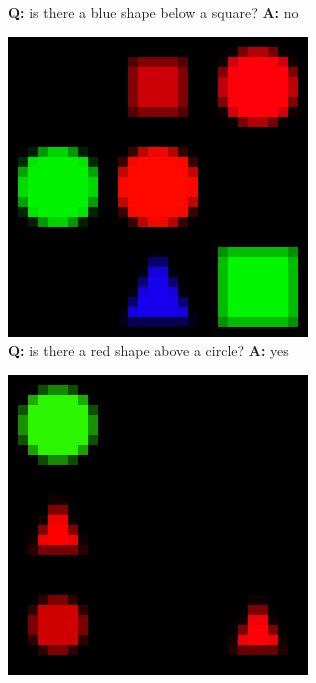 \begin{figure}[ht]
\begin{subfigure}[b]{0.24\linewidth}
    \caption{\textbf{Q:} is there a blue shape below a square? \textbf{A:} no}
     \end{subfigure}
     \hfill
     \begin{subfigure}[b]{0.24\linewidth}
    \centering
    \includegraphics[width=\linewidth]{images/datasets/shapes2_big.png}
    \caption{\textbf{Q:} is there a red shape above a circle? \textbf{A:} yes}
     \end{subfigure}
     \hfill
     \begin{subfigure}[b]{0.24\linewidth}
     \centering
    \includegraphics[width=\linewidth]{images/datasets/shapes3_big.png}

\end{subfigure}
\end{figure}
